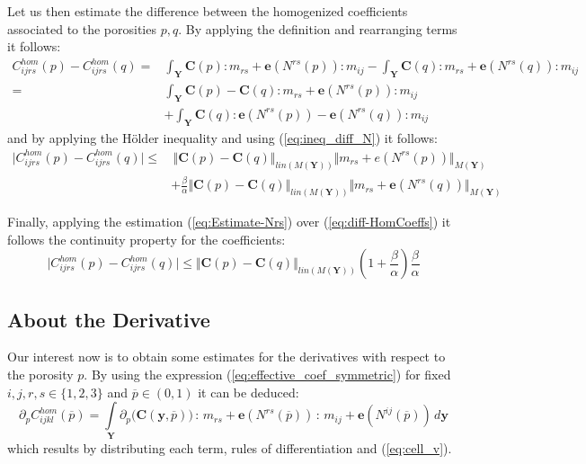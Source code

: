 Let us then estimate the difference between the homogenized coefficients associated to the porosities $p, q$. By applying the definition and rearranging terms it follows:
\begin{equation*}
    \begin{aligned}
        C^{hom}_{ijrs}(p) - C^{hom}_{ijrs}(q) = & \int_{\mathbf{Y}} \mathbf{C}(p):m_{rs} + \mathbf{e}(N^{rs}(p)):m_{ij} - \int_{\mathbf{Y}} \mathbf{C}(q):m_{rs} + \mathbf{e}(N^{rs}(q)):m_{ij}\\
        = & \int_{\mathbf{Y}} \mathbf{C}(p) - \mathbf{C}(q):m_{rs} + \mathbf{e}(N^{rs}(p)):m_{ij} \\
        & + \int_{\mathbf{Y}} \mathbf{C}(q):\mathbf{e}(N^{rs}(p)) - \mathbf{e}(N^{rs}(q)):m_{ij} 
    \end{aligned}
\end{equation*}
and by applying the H\"{o}lder inequality and using (\ref{eq:ineq_diff_N}) it follows:
\begin{equation}
    \label{eq:diff-HomCoeffs}
    \begin{aligned}
        \vert C^{hom}_{ijrs}(p) - C^{hom}_{ijrs}(q)\vert \leq & \, \Vert \mathbf{C}(p)-\mathbf{C}(q) \Vert_{lin(M(\mathbf{Y}))} \Vert m_{rs}+e(N^{rs}(p)) \Vert_{M(\mathbf{Y})} \\
         & +  \frac{\beta}{\alpha} \Vert \mathbf{C}(p)-\mathbf{C}(q) \Vert_{lin(M(\mathbf{Y}))} \Vert m_{rs}+\mathbf{e}(N^{rs}(q)) \Vert_{M(\mathbf{Y})} 
    \end{aligned}
\end{equation}

Finally, applying the estimation (\ref{eq:Estimate-Nrs}) over (\ref{eq:diff-HomCoeffs}) it follows the continuity property for the coefficients:
\begin{equation}
    \label{ContinuityPropHom}
    \vert C^{hom}_{ijrs}(p) - C^{hom}_{ijrs}(q)\vert \leq \Vert \mathbf{C}(p) - \mathbf{C}(q) \Vert_{lin(M(\mathbf{Y}))} (1+\frac{\beta}{\alpha})\frac{\beta}{\alpha}
\end{equation}

\subsection{About the Derivative}
Our interest now is to obtain some estimates for the derivatives with respect to the porosity $p$. By using the expression (\ref{eq:effective_coef_symmetric}) for fixed $i,j,r,s \in \{1,2,3\}$ and $\overline{p} \in (0,1)$ it can be deduced:
\begin{equation}
    \label{eq:DerivHomCoeff}
    \partial_{p}  C_{ijkl}^{hom} (\overline{p}) = \int\limits_{\mathbf{Y}} \partial_{p}\big( \mathbf{C}(\mathbf{y},\overline{p}) \big)\, : \,m_{rs}+\mathbf{e}(N^{rs}(\overline{p}))\, :\,m_{ij}+\mathbf{e}(N^{ij}(\overline{p})) \, d\mathbf{y} 
\end{equation}
which results by distributing each term, rules of differentiation and (\ref{eq:cell_v}).

